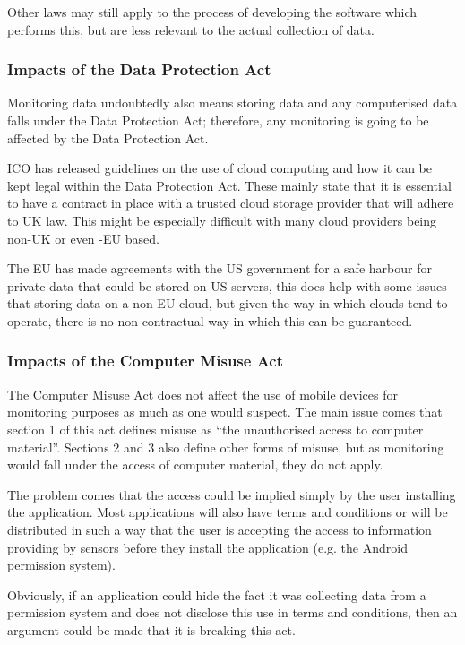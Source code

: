\documentclass[12pt, a4paper]{article}
\begin{document}
Other laws may still apply to the process of developing the software which
performs this, but are less relevant to the actual collection of data.


\subsubsection{Impacts of the Data Protection Act}
Monitoring data undoubtedly also means storing data and any computerised data
falls under the Data Protection Act; therefore, any monitoring is going to be
affected by the Data Protection Act.

\gls{ICO} has released guidelines\cite{ico2012cloud} on the use of cloud 
computing and how it can be kept legal within the Data Protection Act. These
mainly state that it is essential to have a contract in place with a trusted
cloud storage provider that will adhere to UK law. This might be especially
difficult with many cloud providers being non-UK or even -EU based.

The EU has made agreements with the US government for a safe harbour for
private data that could be stored on US servers\cite{eu2000safe}, this does
help with some issues that storing data on a non-EU cloud, but given the way in
which clouds tend to operate, there is no non-contractual way in which this can
be guaranteed.

\subsubsection{Impacts of the Computer Misuse Act}
The Computer Misuse Act does not affect the use of mobile devices for monitoring
purposes as much as one would suspect. The main issue comes that section 1 of
this act defines misuse as ``the unauthorised access to computer
material''\cite{cma1990}. Sections 2 and 3 also define other forms of misuse, 
but as monitoring would fall under the access of computer material, they do not
apply.

The problem comes that the access could be implied simply by the user installing
the application. Most applications will also have terms and conditions or will
be distributed in such a way that the user is accepting the access to
information providing by sensors before they install the application (e.g. the
Android permission system).

Obviously, if an application could hide the fact it was collecting data from a
permission system and does not disclose this use in terms and conditions, then
an argument could be made that it is breaking this act.
\end{document}
